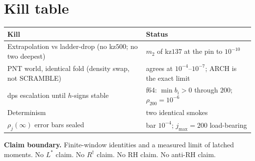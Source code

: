 \documentclass[11pt]{article}
\begin{document}
\section{Kill table}\label{sec:kills}

\begin{center}
\begin{tabular}{@{}lp{8.2cm}@{}}
\toprule
Kill & Status \\
\midrule
Extrapolation vs ladder-drop
  (no kz$500$; no two deepest)
  & $m_2$ of kz$137$ at the pin to $10^{-10}$ \\
PNT world, identical fold
  (density swap, not SCRAMBLE)
  & agrees at $10^{-4}$--$10^{-7}$;
    ARCH is the exact limit \\
dps escalation until $h$-signs stable
  & f64: $\min b_i>0$ through $200$;
    $\rho_{200}=10^{-6}$ \\
Determinism
  & two identical smokes \\
$\rho_j(\infty)$ error bars sealed
  & bar $10^{-4}$; $j_{\max}=200$
    load-bearing \\
\bottomrule
\end{tabular}
\end{center}

\medskip\noindent
\textbf{Claim boundary.}\enspace
Finite-window identities and a measured
limit of latched moments.
No $L^{*}$ claim.
No $R^{\dagger}$ claim.
No RH claim.
No anti-RH claim.
\end{document}

